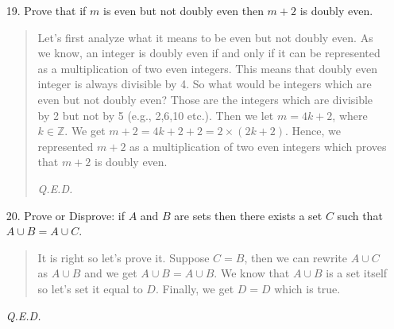 \documentclass[12pt, a4paper]{article}             %
\begin{document}
\begin{enumerate}
\item[19.]
Prove that if $m$ is even but not doubly even then $m + 2$ is doubly even.
\begin{quote}
Let's first analyze what it means to be even but not doubly even. As we know, an integer
is doubly even if and only if it can be represented as a multiplication of two even integers.
This means that doubly even integer is always divisible by 4. So what would be integers which are even
but not doubly even? Those are the integers which are divisible by 2 but not by 5 (e.g., 2,6,10 etc.).
Then we let $m = 4k + 2$, where $k \in \mathbb{Z}$. We get $m + 2 = 4k + 2 + 2 = 2 \times (2k + 2)$.
Hence, we represented $m + 2$ as a multiplication of two even integers which proves that $m + 2$ is
doubly even.
\begin{flushright}
\textit{Q.E.D.}
\end{flushright}
\end{quote}

\item[20.]
Prove or Disprove: if $A$ and $B$ are sets then there exists a set $C$ such that $A \cup B = A \cup C$.
\begin{quote}
It is right so let's prove it.
Suppose $C = B$, then we can rewrite $A \cup C$ as $A \cup B$ and we get $A \cup B = A \cup B$.
We know that $A \cup B$ is a set itself so let's set it equal to $D$. Finally, we get $D = D$ which
is true.
\end{quote}
\begin{flushright}
\textit{Q.E.D.}
\end{flushright}
\end{enumerate}
\end{document}
